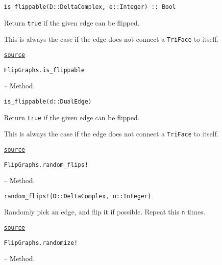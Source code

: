 \begin{adjustwidth}{2em}{0pt}


\begin{verbatim}
is_flippable(D::DeltaComplex, e::Integer) :: Bool
\end{verbatim}

Return \texttt{true} if the given edge can be flipped.

This is always the case if the edge does not connect a \texttt{TriFace} to itself.



\href{https://github.com/schto223/FlipGraphs.jl/blob/e35d43698a06b86273148826b79d585ba04fcd26/src/deltaComplex.jl#L838-L844}{\texttt{source}}


\end{adjustwidth}
\hypertarget{2293470848079560427}{\texttt{FlipGraphs.is\_flippable}}  -- {Method.}

\begin{adjustwidth}{2em}{0pt}


\begin{verbatim}
is_flippable(d::DualEdge)
\end{verbatim}

Return \texttt{true} if the given edge can be flipped.

This is always the case if the edge does not connect a \texttt{TriFace} to itself.



\href{https://github.com/schto223/FlipGraphs.jl/blob/e35d43698a06b86273148826b79d585ba04fcd26/src/deltaComplex.jl#L849-L855}{\texttt{source}}


\end{adjustwidth}
\hypertarget{5742364185354903394}{\texttt{FlipGraphs.random\_flips!}}  -- {Method.}

\begin{adjustwidth}{2em}{0pt}


\begin{verbatim}
random_flips!(D::DeltaComplex, n::Integer)
\end{verbatim}

Randomly pick an edge, and flip it if possible. Repeat this \texttt{n} times.



\href{https://github.com/schto223/FlipGraphs.jl/blob/e35d43698a06b86273148826b79d585ba04fcd26/src/deltaComplex.jl#L1023-L1027}{\texttt{source}}


\end{adjustwidth}
\hypertarget{6729796171434163830}{\texttt{FlipGraphs.randomize!}}  -- {Method.}

